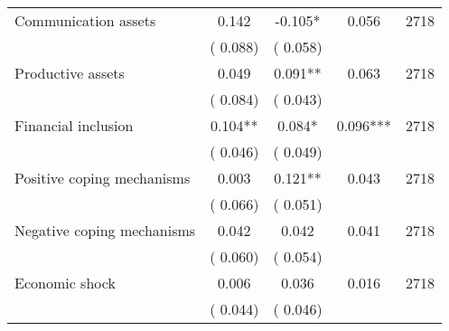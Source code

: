 \begin{tabular}{l*{4}{c}}
 Communication assets &              0.142 &        -0.105* &           0.056 & 2718                       \\  
                 &        (       0.088)                   &        (       0.058)                        &                                                             &                                                      \\      

 Productive assets &              0.049 &         0.091** &           0.063 & 2718                       \\  
                 &        (       0.084)                   &        (       0.043)                        &                                                             &                                                      \\      

 Financial inclusion &              0.104** &         0.084* &           0.096*** & 2718                       \\  
                 &        (       0.046)                   &        (       0.049)                        &                                                             &                                                      \\      

 Positive coping mechanisms &              0.003 &         0.121** &           0.043 & 2718                       \\  
                 &        (       0.066)                   &        (       0.051)                        &                                                             &                                                      \\      

 Negative coping mechanisms &              0.042 &         0.042 &           0.041 & 2718                       \\  
                 &        (       0.060)                   &        (       0.054)                        &                                                             &                                                      \\      

 Economic shock &              0.006 &         0.036 &           0.016 & 2718                       \\  
                 &        (       0.044)                   &        (       0.046)                        &                                                             &                                                      \\      


\end{tabular}
